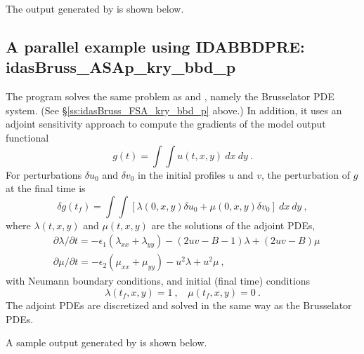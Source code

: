 The output generated by  is shown below.




\subsection{A parallel example using IDABBDPRE: idasBruss\_ASAp\_kry\_bbd\_p}
\label{ss:idasBruss_ASAp_kry_bbd_p}

The  program solves the same problem as
 and , namely the
Brusselator PDE system.  (See \S\ref{ss:idasBruss_FSA_kry_bbd_p} above.)
In addition, it uses an adjoint sensitivity approach to compute the
gradients of the model output functional
\begin{equation*}
  g(t) = \int \int u(t,x,y)~dx~dy ~.
\end{equation*}
For perturbations $\delta u_0$ and $\delta v_0$ in the initial profiles
$u$ and $v$, the perturbation of $g$ at the final time is
\begin{equation*}
  \delta g(t_f) = \int \int [\lambda(0,x,y) \delta u_0 + \mu(0,x,y) \delta v_0] ~dx~dy ~,
\end{equation*}
where $\lambda(t,x,y)$ and $\mu(t,x,y)$ are the solutions of the adjoint PDEs,
\begin{equation*}
\begin{split}
  &\partial \lambda / \partial t = -\epsilon_1 (\lambda_{xx} + \lambda_{yy})
                              - (2 u v - B - 1) \lambda + (2 u v - B) \mu \\
  &\partial \mu / \partial t = -\epsilon_2 (\mu_{xx} + \mu_{yy})
                              - u^2 \lambda + u^2 \mu ~,
\end{split}
\end{equation*}
with Neumann boundary conditions, and initial (final time) conditions
\begin{equation*}
  \lambda (t_f,x,y) = 1 ~, ~~~~ \mu (t_f,x,y) =  0 ~.
\end{equation*}
The adjoint PDEs are discretized and solved in the same way as the
Brusselator PDEs.

A sample output generated by  is shown below.

